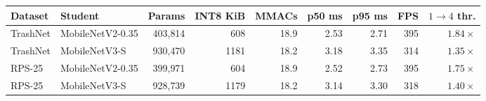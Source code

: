 \begin{tabular}{@{}llrrrrrrr@{}}
\toprule
Dataset & Student & Params & INT8 KiB & MMACs & p50 ms & p95 ms & FPS & $1\!\to\!4$ thr. \\
\midrule
TrashNet & MobileNetV2-0.35 & 403{,}814 & 608 & 18.9 & 2.53 & 2.71 & 395 & $1.84\times$ \\
TrashNet & MobileNetV3-S & 930{,}470 & 1181 & 18.2 & 3.18 & 3.35 & 314 & $1.35\times$ \\
RPS-25 & MobileNetV2-0.35 & 399{,}971 & 604 & 18.9 & 2.52 & 2.73 & 395 & $1.75\times$ \\
RPS-25 & MobileNetV3-S & 928{,}739 & 1179 & 18.2 & 3.14 & 3.30 & 318 & $1.40\times$ \\
\bottomrule
\end{tabular}
